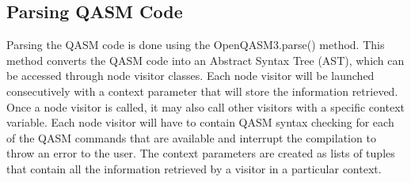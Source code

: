 \subsection{Parsing QASM Code}
Parsing the QASM code is done using the OpenQASM3.parse() method. This method converts the QASM code into an Abstract Syntax Tree (AST), which can be accessed through node visitor classes.
Each node visitor will be launched consecutively with a context parameter that will store the information retrieved.
Once a node visitor is called, it may also call other visitors with a specific context variable. Each node visitor will have to 
contain QASM syntax checking for each of the QASM commands that are available and interrupt the compilation to throw an error to the user.
The context parameters are created as lists of tuples that contain all the information retrieved by a visitor in a particular context.


